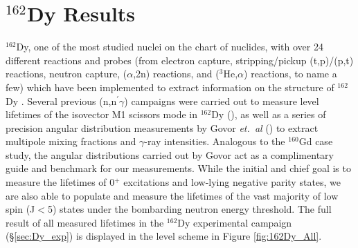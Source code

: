 \section{$^{162}$Dy Results}

$^{162}$Dy, one of the most studied nuclei on the chart of nuclides, with over 24 different reactions and probes (from electron capture, stripping/pickup (t,p)/(p,t) reactions, neutron capture, ($\alpha$,2n) reactions, and ($^3$He,$\alpha$) reactions, to name a few) which have been implemented to extract information on the structure of $^{162}$Dy \cite{Aprahamian200642}. Several previous (n,n$^\prime\gamma$) campaigns were carried out to measure level lifetimes of the isovector M1 scissors mode in $^{162}$Dy (\cite{Yates_162nnp1995}), as well as a series of precision angular distribution measurements by Govor \textit{et.~al} (\cite{Govor_162Dy2002}) to extract multipole mixing fractions and $\gamma$-ray intensities. Analogous to the $^{160}$Gd case study, the angular distributions carried out by Govor act as a complimentary guide and benchmark for our measurements. While the initial and chief goal is to measure the lifetimes of 0$^+$ excitations and low-lying negative parity states, we are also able to populate and measure the lifetimes of the vast majority of low spin (J$<$5) states under the bombarding neutron energy threshold. The full result of all measured lifetimes in the $^{162}$Dy experimental campaign (\S \ref{sec:Dy_exp}) is displayed in the level scheme in Figure \ref{fig:162Dy_All}.

